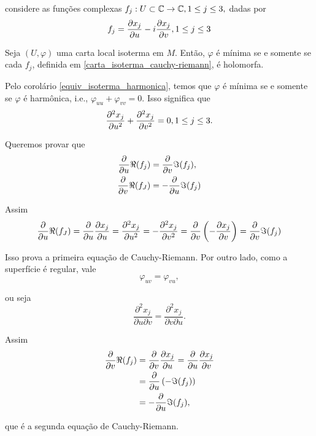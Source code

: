 considere as funções complexas $f_j: U \subset \mathbb{C} \rightarrow \mathbb{C}, 1 \leq j \leq 3,$ dadas por
\begin{equation}\label{carta_isoterma_cauchy-riemann}
f_j = \frac{\partial x_j}{\partial u} - i \frac{\partial x_j}{\partial v}, 1 \leq j \leq 3
\end{equation}

\begin{lema}
	Seja $(U, \varphi)$ uma carta local isoterma em $M$. Então, $\varphi$ é mínima se e somente se cada $f_j$, definida em \ref{carta_isoterma_cauchy-riemann}, é holomorfa.
\end{lema}

\begin{demonstracao}
	Pelo corolário \ref{equiv_isoterma_harmonica}, temos que $\varphi$ é mínima se e somente se $\varphi$ é harmônica, i.e., $\varphi_{uu} + \varphi_{vv} = 0$. Isso significa que
	\begin{equation*}
	\frac{\partial^2 x_j}{\partial u^2} + \frac{\partial^2 x_j}{\partial v^2} = 0, 1 \leq j \leq 3.
	\end{equation*}
	
	Queremos provar que
	\begin{align*}
	\frac{\partial}{\partial u} \Re(f_j) &= \frac{\partial}{\partial v} \Im(f_j),\\
	\frac{\partial}{\partial v} \Re(f_J) &= - \frac{\partial}{\partial u} \Im(f_j)
	\end{align*}
	
	Assim
	\begin{multline*}
	\frac{\partial}{\partial u} \Re(f_J) = \frac{\partial}{\partial u} \frac{\partial x_j}{\partial u} = \frac{\partial^2 x_j}{\partial u^2} = - \frac{\partial^2 x_j}{\partial v^2} = \frac{\partial}{\partial v} \left( - \frac{\partial x_j}{\partial v} \right) = \frac{\partial}{\partial v} \Im(f_j)
	\end{multline*}
	
	Isso prova a primeira equação de Cauchy-Riemann. Por outro lado, como a superfície é regular, vale
	\begin{equation*}
	\varphi_{uv} = \varphi_{vu},
	\end{equation*}
	
	ou seja
	\begin{equation*}
	\frac{\partial^2 x_j}{\partial u \partial v} = \frac{\partial^2 x_j}{\partial v \partial u}.
	\end{equation*}
	
	Assim
	\begin{align*}
	\frac{\partial}{\partial v} \Re(f_j) &= \frac{\partial}{\partial v} \frac{\partial x_j}{\partial u} = \frac{\partial}{\partial u} \frac{\partial x_j}{\partial v}\\
	&= \frac{\partial}{\partial u} \left( - \Im(f_j) \right)\\
	&= - \frac{\partial}{\partial u} \Im(f_j),
	\end{align*}
	
	que é a segunda equação de Cauchy-Riemann.
\end{demonstracao}

